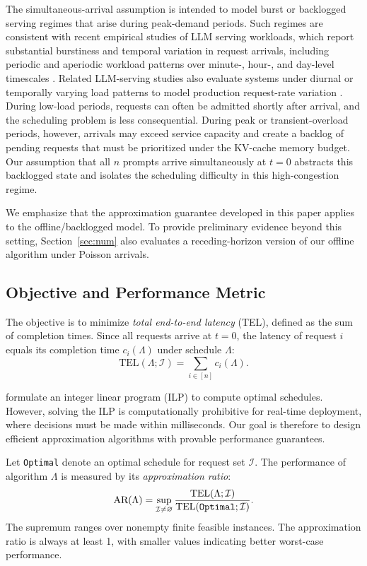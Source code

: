 \documentclass[nonblindrev]{informs3_hide}
\newcommand{\opt}{\texttt{Optimal}}
\begin{document}
The simultaneous-arrival assumption is intended to model burst or backlogged serving regimes that arise during peak-demand periods. Such regimes are consistent with recent empirical studies of LLM serving workloads, which report substantial burstiness and temporal variation in request arrivals, including periodic and aperiodic workload patterns over minute-, hour-, and day-level timescales \citep{wang2024burstgpt}. Related LLM-serving studies also evaluate systems under diurnal or temporally varying load patterns to model production request-rate variation \citep{goel2026qoserve, jiang2026oserve}. During low-load periods, requests can often be admitted shortly after arrival, and the scheduling problem is less consequential. During peak or transient-overload periods, however, arrivals may exceed service capacity and create a backlog of pending requests that must be prioritized under the KV-cache memory budget. Our assumption that all \(n\) prompts arrive simultaneously at \(t=0\) abstracts this backlogged state and isolates the scheduling difficulty in this high-congestion regime.

We emphasize that the approximation guarantee developed in this paper applies to the offline/backlogged model. To provide preliminary evidence beyond this setting, Section~\ref{sec:num} also evaluates a receding-horizon version of our offline algorithm under Poisson arrivals.

\subsection{Objective and Performance Metric}

The objective is to minimize \emph{total end-to-end latency} (TEL), defined as the sum of completion times. Since all requests arrive at \(t = 0\), the latency of request \(i\) equals its completion time \(c_i(\Lambda)\) under schedule \(\Lambda\):
\[
\text{TEL}(\Lambda; \mathcal{I}) = \sum_{i \in [n]} c_i(\Lambda).
\]

\cite{jaillet2025online} formulate an integer linear program (ILP) to compute optimal schedules. However, solving the ILP is computationally prohibitive for real-time deployment, where decisions must be made within milliseconds. Our goal is therefore to design efficient approximation algorithms with provable performance guarantees.

Let \opt{} denote an optimal schedule for request set \(\mathcal{I}\). The performance of algorithm \(\Lambda\) is measured by its \emph{approximation ratio}:
\[
\text{AR}(\Lambda) = \sup_{\mathcal{I}\ne\varnothing} \frac{\text{TEL}(\Lambda; \mathcal{I})}{\text{TEL}(\text{\opt}; \mathcal{I})}.
\]
The supremum ranges over nonempty finite feasible instances. The approximation ratio is always at least 1, with smaller values indicating better worst-case performance.
\end{document}
